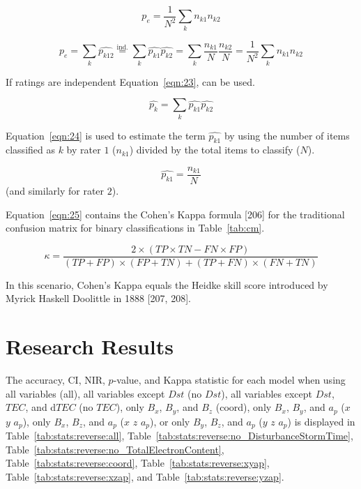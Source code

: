 \documentclass[sn-mathphys-num]{sn-jnl}%
\begin{document}
\begin{equation}
	p_{e}={\frac {1}{N^{2}}}\sum_{k}n_{k1}n_{k2}
	\label{eqn:21}
\end{equation}

\begin{equation}
	p_{e}=\sum_{k}{\widehat {p_{k12}}}{\overset{\text{ind.}}{=}}\sum_{k}{\widehat {p_{k1}}}{\widehat {p_{k2}}}=\sum_{k}{\frac {n_{k1}}{N}}{\frac {n_{k2}}{N}}={\frac {1}{N^{2}}}\sum_{k}n_{k1}n_{k2}
	\label{eqn:22}
\end{equation}

If ratings are independent Equation~\ref{eqn:23}, can be used.

\begin{equation}
	\textstyle{\widehat{p_{k}}}=\sum_{k}{\widehat{p_{k1}}}{\widehat {p_{k2}}}
	\label{eqn:23}
\end{equation}

Equation~\ref{eqn:24} is used to estimate the term $\widehat{p_{k1}}$ by using the number of items classified as $k$ by rater $1$ ($n_{k1}$) divided by the total items to classify ($N$).

\begin{equation}
	\widehat {p_{k1}}=\frac{n_{k1}}{N}
	\label{eqn:24}
\end{equation}
 (and similarly for rater $2$).
 
Equation~\ref{eqn:25} contains the Cohen's Kappa formula [206] for the traditional confusion matrix for binary classifications in Table~\ref{tab:cm}.

\begin{equation}
	\kappa ={\frac{2\times (TP\times TN-FN\times FP)}{(TP+FP)\times (FP+TN)+(TP+FN)\times (FN+TN)}}
	\label{eqn:25}
\end{equation}

In this scenario, Cohen's Kappa equals the Heidke skill score introduced by Myrick Haskell Doolittle in 1888 [207, 208].

\section{Research Results}
\label{sec:Results}

The accuracy, CI, NIR, $p$-value, and Kappa statistic for each model when using all variables (all), all variables except $Dst$ (no $Dst$), all variables except $Dst$, $TEC$, and d$TEC$ (no $TEC$), only $B_{x}$, $B_{y}$, and $B_{z}$ (coord), only $B_{x}$, $B_{y}$, and $a_{p}$ ($x$ $y$ $a_{p}$), only $B_{x}$, $B_{z}$, and $a_{p}$ ($x$ $z$ $a_{p}$), or only $B_{y}$, $B_{z}$, and $a_{p}$ ($y$ $z$ $a_{p}$) is displayed in Table~\ref{tab:stats:reverse:all}, Table~\ref{tab:stats:reverse:no_DisturbanceStormTime}, Table~\ref{tab:stats:reverse:no_TotalElectronContent}, Table~\ref{tab:stats:reverse:coord}, Table~\ref{tab:stats:reverse:xyap}, Table~\ref{tab:stats:reverse:xzap}, and Table~\ref{tab:stats:reverse:yzap}.
\end{document}
